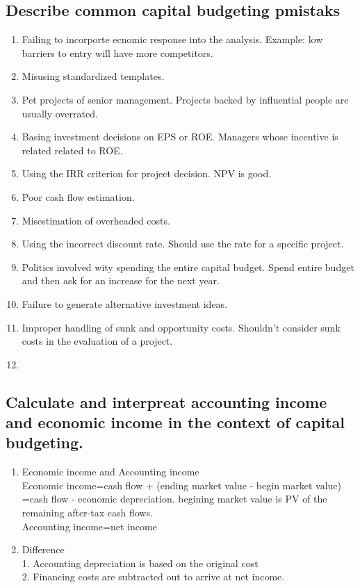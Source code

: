 \documentclass{article}
\newcommand{\be}{\begin{enumerate}}
\newcommand{\ee}{\end{enumerate}}
\begin{document}
\subsection{Describe common capital budgeting pmistaks}
\be
    \item Failing to incorporte ecnomic response into the analysis. Example: 
        low barriers to entry will have more competitors.
    \item Misusing standardized templates.
    \item Pet projects of senior management. Projects backed by influential people
        are usually overrated.
    \item Basing investment decisions on EPS or ROE. Managers whose incentive is related
        related to ROE.
    \item Using the IRR criterion for project decision. NPV is good.
    \item Poor cash flow estimation.
    \item Misestimation of overheaded costs.
    \item Using the incorrect discount rate. Should use the rate for a specific project.
    \item Politics involved wity spending the entire capital budget. Spend entire budget
        and then ask for an increase for the next year.
    \item Failure to generate alternative investment ideas.
    \item Improper handling of sunk and opportunity costs. Shouldn't consider sunk costs
        in the evaluation of a project.
    \item 
\ee
\subsection{Calculate and interpreat accounting income and economic income in the 
context of capital budgeting.}
\be
    \item Economic income and Accounting income
        \\Economic income=cash flow + (ending market value - begin market value)
        =cash flow - economic depreciation. begining market value is PV of the remaining after-tax 
        cash flows.
        \\Accounting income=net income
    \item Difference
        \\ 1. Accounting depreciation is based on the original cost
        \\ 2. Financing costs are subtracted out to arrive at net income.
\ee
\end{document}
